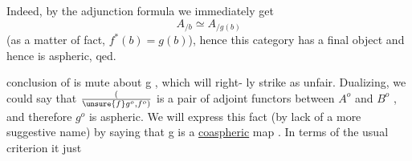  Indeed, by the adjunction formula we immediately get
\[ A_{/b} \simeq A_{/g(b)} \]
(as a matter of fact, $f^{*}(b) = g(b)$), hence this category has a final
object and hence is aspheric, qed.

  conclusion of  is mute about g , which will right-%
ly strike as unfair. Dualizing, we could say that $(\over{\unsure{f}}{g}^{o} ,f^{o})$ is a pair
of adjoint functors between $A^{o}$ and $B^{o}$ , and therefore $g^{o}$ is aspheric.
We will express this fact (by lack of a more suggestive name) by saying
that g is a \uline{coaspheric} map .  In terms of the usual criterion\hand{,} it just

